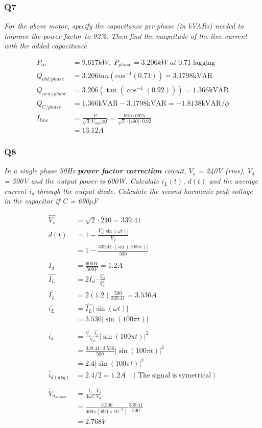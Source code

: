 \documentclass[a4paper,11pt]{article}
\begin{document}
\subsubsection*{Q7}
\textit{For the above motor, specify the capacitance per phase (in kVARs) needed to improve the power factor to 92\%. Then find the magnitude of the line current with the added capacitance}

\begin{align*}
    P_{in} &= 9.617kW,\; P_{phase}=3.206kW\;at\;0.71\;\mathrm{lagging}\\
    Q_{old/phase} &= 3.206tan(cos^{-1}(0.71)) = 3.1798 \mathrm{kVAR} \\
    Q_{new/phase} &= 3.206\left(\tan\left(\cos^{-1}\left(0.92\right)\right)\right) = 1.366 \mathrm{kVAR} \\
    Q_{C/phase} &= 1.366\mathrm{kVAR} - 3.1798\mathrm{kVAR}=-1.8138 \mathrm{kVAR}/\phi\\
    I_{line} &= \frac{P}{\sqrt{3}|V_{line}|pf} = \frac{9616.6925}{\sqrt{3}\cdot\left|460\right|\cdot0.92}\\
    &= 13.12 A
\end{align*}


\subsubsection*{Q8}
\textit{In a single phase 50Hz \textbf{power factor correction} circuit, $V_s$ = 240V (rms), $V_d$ = 500V and the output power is 600W. Calculate $i_L(t)$, $d(t)$ and the average current $i_d$ through the output diode. Calculate the second harmonic peak voltage in the capacitor if C = 690$\mu$F}

\begin{align*}
    \hat{V_s} &= \sqrt{2} \cdot 240 = 339.41\\
    d(t) &= 1-\frac{\hat{V_s} | \sin(\omega t)|}{V_d}\\
    &= 1-\frac{339.41 \cdot | \sin(100\pi t)|}{500}\\\\
    I_d &= \frac{600W}{500V} = 1.2A\\
    \hat{I_L} &= 2I_d \cdot \frac{V_d}{\hat{V_s}}\\
    \hat{I_L} &= 2(1.2)\frac{500}{339.41} = 3.536A\\
    \bar{i_L} &= \hat{I_L}|\sin(\omega t)|\\
    &= 3.536|\sin(100\pi t)|\\\\
    \bar{i_d} &= \frac{\hat{V_s} \cdot \hat{I_L}}{V_d}|\sin(100\pi t)|^2 \\
              &= \frac{339.41 \cdot 3.536}{500}|\sin(100\pi t)|^2\\
              &= 2.4|\sin(100\pi t)|^2 \\
    \bar{i}_{d(avg)} &= 2.4/2 = 1.2A \;\;\; (\mathrm{The \; signal \; is \; symetrical})\\\\
    \hat{V}_{d_{second}} &= \frac{\hat{I_L}}{4\omega C}\frac{\hat{V_s}}{V_d} \\
     &= \frac{3.536}{400\pi(690\times10^{-6})}\frac{339.41}{500} \\
    &= 2.768V
\end{align*}
\end{document}
